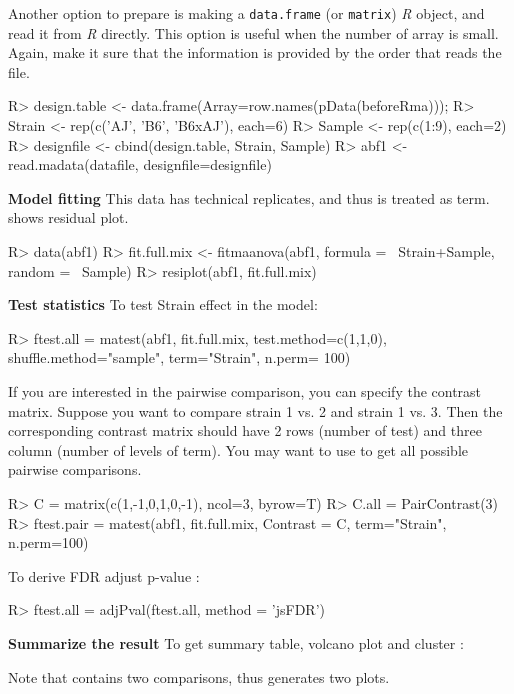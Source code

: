 Another option to prepare  is making a {\tt data.frame}
(or {\tt matrix}) {\em R} object, and read it from {\em R} directly. This option is useful when the number of array is small. Again, make it sure that the information is provided by the order that  reads the file.  
\begin{Sinput}
R> design.table <- data.frame(Array=row.names(pData(beforeRma)));
R> Strain <- rep(c('AJ', 'B6', 'B6xAJ'), each=6)
R> Sample <- rep(c(1:9), each=2)
R> designfile <- cbind(design.table, Strain, Sample)
R> abf1 <- read.madata(datafile, designfile=designfile)
\end{Sinput}
{\bf Model fitting} This data has technical replicates, and thus  is treated as  term.  shows residual plot. 
\begin{Sinput}
R> data(abf1)
R> fit.full.mix <- fitmaanova(abf1, formula = ~Strain+Sample, 
   random = ~Sample)
R> resiplot(abf1, fit.full.mix)
\end{Sinput}
{\bf Test statistics} To test Strain effect in the model:
\begin{Sinput}
R> ftest.all = matest(abf1, fit.full.mix, test.method=c(1,1,0),
    shuffle.method="sample", term="Strain", n.perm= 100)
\end{Sinput}
If you are interested in the pairwise comparison, you can specify the contrast
matrix. Suppose you want to compare strain 1 vs. 2 and
strain 1 vs. 3. Then the corresponding contrast matrix should have 2 rows
(number of test) and three column (number of levels of
term). You may want to use  to get all possible pairwise comparisons.  
\begin{Sinput}
R> C = matrix(c(1,-1,0,1,0,-1), ncol=3, byrow=T)
R> C.all = PairContrast(3)
R> ftest.pair = matest(abf1, fit.full.mix, Contrast = C, 
   term="Strain", n.perm=100)
\end{Sinput}
To derive FDR adjust p-value :
\begin{Sinput}
R> ftest.all = adjPval(ftest.all, method = 'jsFDR')
\end{Sinput}
{\bf Summarize the result} To get summary table, volcano plot and cluster :  
Note that  contains two comparisons, thus
 generates two plots. 
